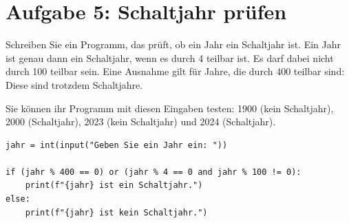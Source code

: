 \documentclass[ngerman,11pt]{article}
\begin{document}
\section*{Aufgabe 5: Schaltjahr prüfen}
Schreiben Sie ein Programm, das prüft, ob ein Jahr ein Schaltjahr ist. Ein Jahr ist genau dann ein Schaltjahr, wenn es durch 4 teilbar ist. Es darf dabei nicht durch 100 teilbar sein. Eine Ausnahme gilt für Jahre, die durch 400 teilbar sind: Diese sind trotzdem Schaltjahre.

Sie können ihr Programm mit diesen Eingaben testen: 1900 (kein Schaltjahr), 2000 (Schaltjahr), 2023 (kein Schaltjahr) und 2024 (Schaltjahr).

\begin{loesung}
\color{blue}
\begin{lstlisting}[style=solution]
jahr = int(input("Geben Sie ein Jahr ein: "))

if (jahr % 400 == 0) or (jahr % 4 == 0 and jahr % 100 != 0):
    print(f"{jahr} ist ein Schaltjahr.")
else:
    print(f"{jahr} ist kein Schaltjahr.")
\end{lstlisting}
\end{loesung}
\end{document}
